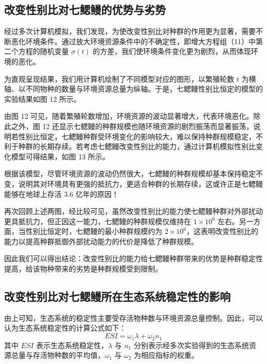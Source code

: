 \documentclass[11pt,a4paper]{ctexart}
\begin{document}
\subsection{改变性别比对七鳃鳗的优势与劣势}

经过多次计算机模拟，我们发现，为使改变性别比对种群的作用更为显著，需要不断恶化环境条件。通过放大环境资源条件中的不确定性，即增大方程组（11）中第二个方程的随机变量 $\sigma(t)$ 的方差，我们使环境条件变化更为剧烈，从而体现环境的恶化。

为直观呈现结果，我们用计算机绘制了不同模型对应的图形，以繁殖轮数 $t$ 为横轴、以不同物种的数量与环境资源总量为纵轴。于是，七鳃鳗性别比恒定的模型的实验结果如图 12 所示。

由图 12 可见，随着繁殖轮数增加，环境资源的波动显著增大，代表环境恶化。除此之外，图 12 还显示七鳃鳗的种群规模也随环境资源的剧烈振荡而显著振荡，说明若性别比恒定，七鳃鳗种群受环境变化的影响较大，难以保持种群规模稳定，不利于种群的长期存续。若考虑七鳃鳗改变性别比的能力，通过计算机模拟性别比变化模型可得结果，如图 13 所示。

根据该模型，尽管环境资源的波动仍然很大，七鳃鳗的种群规模却基本保持稳定不变，说明其对环境具有更强的抵抗力，更适合种群的长期存续，这或许正是七鳃鳗能够在地球上存活 3.6 亿年的原因！

再次回顾上述两图，经比较可见，虽然改变性别比的能力使七鳃鳗种群对外部扰动更具抵抗力，但正因这一能力，七鳃鳗的种群规模仅维持在 $1\times10^{6}$ 左右。另一方面，当性别比恒定时，七鳃鳗的最小种群规模约为 $2\times10^{6}$，这表明改变性别比的能力以提高种群抵御外部扰动能力的代价是降低了种群规模。

因此我们可以得出结论：改变性别比的能力给七鳃鳗种群带来的优势是种群稳定性提高，给该物种带来的劣势是种群规模受到限制。

\subsection{改变性别比对七鳃鳗所在生态系统稳定性的影响}

由上可知，生态系统的稳定性主要受存活物种数与环境资源总量控制。因此，可以认为生态系统稳定性的计算公式如下：
\begin{equation}
ESI=\omega_{1}\lambda+\omega_{2}n_{1}
\end{equation}
其中 $ESI$ 表示生态系统稳定性，$\lambda$ 与 $n_{1}$ 分别表示经多次实验得到的生态系统资源总量与存活物种数的平均值，$\omega_{1}$ 与 $\omega_{2}$ 为相应指标的权重。
\end{document}
